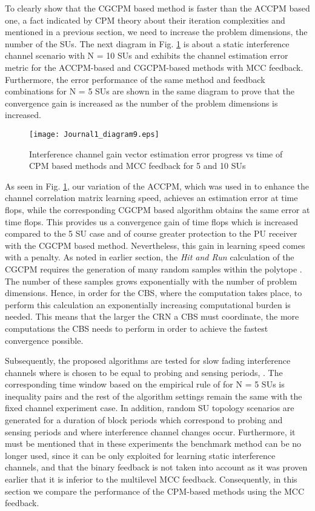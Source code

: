 \documentclass[journal]{IEEEtran}
\begin{document}
To clearly show that the CGCPM based method is faster than the ACCPM based one, a fact indicated by CPM theory about their iteration complexities and mentioned in a previous section, we need to increase the problem dimensions, the number of the SUs. The next diagram in Fig. \ref{fig11} is about a static interference channel scenario with N = 10 SUs and exhibits the channel estimation error metric for the ACCPM-based and CGCPM-based methods with MCC feedback. Furthermore, the error performance of the same method and feedback combinations for N = 5 SUs are shown in the same diagram to prove that the convergence gain is increased as the number of the problem dimensions is increased.
\begin{figure}[!h]
\centering
\texttt{[image: Journal1\_diagram9.eps]}
\caption{Interference channel gain vector estimation error progress vs time of CPM based methods and MCC feedback for 5 and 10 SUs}
\label{fig11}
\end{figure}
As seen in Fig. \ref{fig11}, our variation of the ACCPM, which was used in \cite{biban73} to enhance the channel correlation matrix learning speed, achieves an estimation error  at  time flops, while the corresponding CGCPM based algorithm obtains the same error at  time flops. This provides us a convergence gain of  time flops which is increased compared to the 5 SU case and of course greater protection to the PU receiver with the CGCPM based method. Nevertheless, this gain in learning speed comes with a penalty. As noted in earlier section, the \textit{Hit and Run} calculation of the CGCPM requires the generation of many random samples within the polytope . The number of these samples grows exponentially with the number of problem dimensions. Hence, in order for the CBS, where the  computation takes place, to perform this calculation an exponentially increasing computational burden is needed. This means that the larger the CRN a CBS must coordinate, the more computations the CBS needs to perform in order to achieve the fastest convergence possible.

Subsequently, the proposed algorithms are tested for slow fading interference channels where  is chosen to be equal to  probing and sensing periods, . The corresponding time window based on the empirical rule of  for N = 5 SUs is  inequality pairs and the rest of the algorithm settings remain the same with the fixed channel experiment case. In addition,  random SU topology scenarios are generated for a duration of  block periods which correspond to  probing and sensing periods and where  interference channel changes occur. Furthermore, it must be mentioned that in these experiments the benchmark method can be no longer used, since it can be only exploited for learning static interference channels, and that the binary feedback is not taken into account as it was proven earlier that it is inferior to the multilevel MCC feedback. Consequently, in this section we compare the performance of the CPM-based methods using the MCC feedback.
\end{document}
